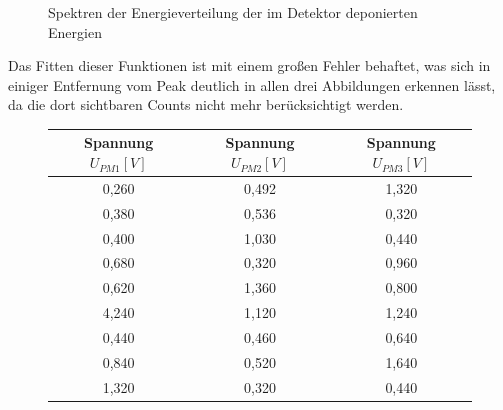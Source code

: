 {\begin{figure}[htbp]
                \caption{Spektren der Energieverteilung der im Detektor deponierten Energien}
                \label{spektren}
            \end{figure}
            Das Fitten dieser Funktionen ist mit einem großen Fehler behaftet, was sich in einiger Entfernung vom Peak deutlich in allen drei Abbildungen erkennen lässt, da die dort sichtbaren Counts nicht mehr berücksichtigt werden.
            \begin{figure}[htbp]
               \tiny\centering
                    \begin{tabular}{c|c|c}
                         Spannung $U_{PM1} [\unit{V}]$ & Spannung $U_{PM2} [\unit{V}]$ & Spannung $U_{PM3} [\unit{V}]$ \\ 
                   \hline       0,260 & 0,492 & 1,320\\
                                0,380 & 0,536 & 0,320\\
                                0,400 & 1,030 & 0,440\\
                                0,680 & 0,320 & 0,960\\
                                0,620 & 1,360 & 0,800\\
                                4,240 & 1,120 & 1,240\\
                                0,440 & 0,460 & 0,640\\
                                0,840 & 0,520 & 1,640\\
                                1,320 & 0,320 & 0,440\\

\end{tabular}
\end{figure}}
